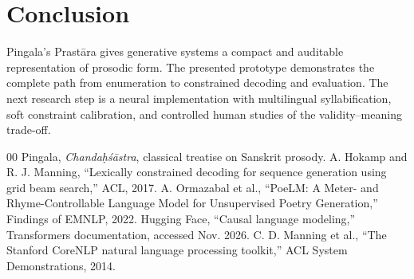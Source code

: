 \documentclass[conference]{IEEEtran}
\begin{document}
\section{Conclusion}
Pingala's Prastāra gives generative systems a compact and auditable representation of prosodic form. The presented prototype demonstrates the complete path from enumeration to constrained decoding and evaluation. The next research step is a neural implementation with multilingual syllabification, soft constraint calibration, and controlled human studies of the validity--meaning trade-off.

\begin{thebibliography}{00}
 Pingala, \emph{Chandaḥśāstra}, classical treatise on Sanskrit prosody.
 A. Hokamp and R. J. Manning, ``Lexically constrained decoding for sequence generation using grid beam search,'' ACL, 2017.
 A. Ormazabal et al., ``PoeLM: A Meter- and Rhyme-Controllable Language Model for Unsupervised Poetry Generation,'' Findings of EMNLP, 2022.
 Hugging Face, ``Causal language modeling,'' Transformers documentation, accessed Nov. 2026.
 C. D. Manning et al., ``The Stanford CoreNLP natural language processing toolkit,'' ACL System Demonstrations, 2014.
\end{thebibliography}
\end{document}
